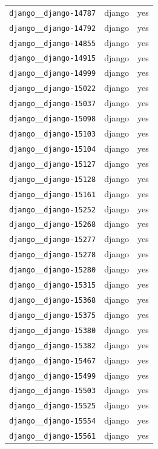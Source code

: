 \begin{longtable}{@{}p{}lp{}@{}}
\texttt{django\_\_django-14787} & django & yes \\
\texttt{django\_\_django-14792} & django & yes \\
\texttt{django\_\_django-14855} & django & yes \\
\texttt{django\_\_django-14915} & django & yes \\
\texttt{django\_\_django-14999} & django & yes \\
\texttt{django\_\_django-15022} & django & yes \\
\texttt{django\_\_django-15037} & django & yes \\
\texttt{django\_\_django-15098} & django & yes \\
\texttt{django\_\_django-15103} & django & yes \\
\texttt{django\_\_django-15104} & django & yes \\
\texttt{django\_\_django-15127} & django & yes \\
\texttt{django\_\_django-15128} & django & yes \\
\texttt{django\_\_django-15161} & django & yes \\
\texttt{django\_\_django-15252} & django & yes \\
\texttt{django\_\_django-15268} & django & yes \\
\texttt{django\_\_django-15277} & django & yes \\
\texttt{django\_\_django-15278} & django & yes \\
\texttt{django\_\_django-15280} & django & yes \\
\texttt{django\_\_django-15315} & django & yes \\
\texttt{django\_\_django-15368} & django & yes \\
\texttt{django\_\_django-15375} & django & yes \\
\texttt{django\_\_django-15380} & django & yes \\
\texttt{django\_\_django-15382} & django & yes \\
\texttt{django\_\_django-15467} & django & yes \\
\texttt{django\_\_django-15499} & django & yes \\
\texttt{django\_\_django-15503} & django & yes \\
\texttt{django\_\_django-15525} & django & yes \\
\texttt{django\_\_django-15554} & django & yes \\
\texttt{django\_\_django-15561} & django & yes \\

\end{longtable}

